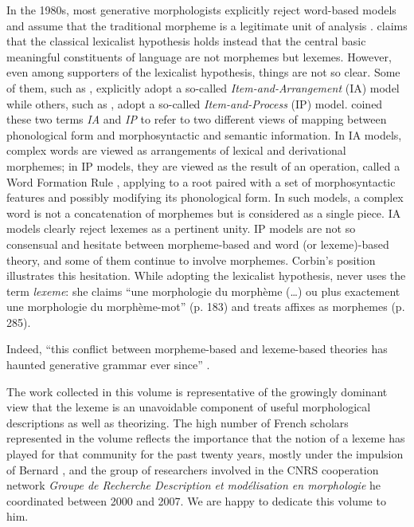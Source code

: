 \documentclass[output=paper]{langsci/langscibook}
\begin{document}
In the 1980s, most generative morphologists \citep{Lieber81, Williams81, Selkirk82} explicitly reject word-based models and assume that
the traditional morpheme is a legitimate unit of analysis \citep{Lieber.2015}. \citet{Aronoff2007} claims that the classical lexicalist hypothesis
\citep{Chomsky1970} holds instead that the central basic meaningful
constituents of language are not morphemes but lexemes. However, even
among supporters of the lexicalist hypothesis, things are not so clear.
Some of them, such as \citet{Halle73}, explicitly adopt a so-called
\emph{Item-and-Arrangement} (IA) model while others, such as \citet{Jackendoff75}, adopt a so-called \emph{Item-and-Process} (IP) model. \citet{Hockett54} coined these two terms \emph{IA} and \emph{IP} to refer to two
different views of mapping between phonological form and morphosyntactic
and semantic information. In IA models, complex words are viewed as
arrangements of lexical and derivational morphemes; in IP models, they
are viewed as the result of an operation, called a Word Formation Rule
\citep{Aronoff1976}, applying to a root paired with a set of morphosyntactic
features and possibly modifying its phonological form. In such models, a
complex word is not a concatenation of morphemes but is considered as a
single piece. IA models clearly reject lexemes as a pertinent unity. IP
models are not so consensual and hesitate between morpheme-based and
word (or lexeme)-based theory, and some of them continue to involve
morphemes. Corbin's position illustrates this hesitation. While adopting
the lexicalist hypothesis, \citet{Corbin87} never uses the term
\emph{lexeme}: she claims ``une morphologie du morphème (\ldots{}) ou
plus exactement une morphologie du morphème-mot'' (p. 183) and treats
affixes as morphemes (p. 285).

Indeed, ``this conflict between morpheme-based and lexeme-based theories
has haunted generative grammar ever since'' %
\citep{Lieber2015}%
.

The work collected in this volume is representative of the growingly
dominant view that the lexeme is an unavoidable component of useful
morphological descriptions as well as theorizing. The high number of
French scholars represented in the volume reflects  the importance
that the notion of a lexeme has played for that community for the past
twenty years, mostly under the impulsion of Bernard %
\citet{Fradin1993,Fradin2003}%
%
,
and the group of researchers involved in the CNRS cooperation network
\emph{Groupe de Recherche Description et modélisation en morphologie} he
coordinated between 2000 and 2007. We are happy to dedicate this volume
to him.
\end{document}
